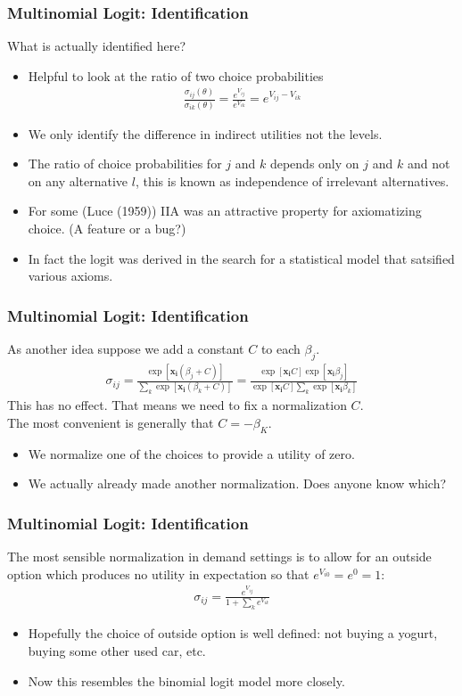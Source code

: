 \documentclass[aspectratio=169,11pt]{beamer}
\begin{document}
\begin{frame}
\frametitle{Multinomial Logit: Identification}
What is actually identified here?
\begin{itemize}
\item Helpful to look at the ratio of two choice probabilities
\begin{align*}
\frac{\sigma_{ij}(\theta)}{\sigma_{ik}(\theta)}  = \frac{e^{V_{ij}}}{e^{V_{ik}}} = e^{V_{ij} - V_{ik}}
\end{align*}
\item We only identify the \alert{difference in indirect utilities} not the levels.
\item The ratio of choice probabilities for $j$ and $k$ depends only on $j$ and $k$ and not on any alternative $l$, this is known as \alert{independence of irrelevant alternatives}.
\item For some (Luce (1959)) IIA was an attractive property for axiomatizing choice. (A feature or a bug?)
\item In fact the logit was derived in the search for a statistical model that satsified various axioms.
\end{itemize}
\end{frame}

\begin{frame}
\frametitle{Multinomial Logit: Identification}
As another idea suppose we add a constant $C$ to each $\beta_j$.
\begin{eqnarray*}
\sigma_{ij} = \frac{\exp[\symbf{x_i} (\beta_j+C) ]}{\sum_k \exp[\symbf{x_i} (\beta_k+C) ]} =  \frac{\exp[\symbf{x_i} C] \exp[\symbf{x_i} \beta_j ]}{\exp[\symbf{x_i} C] \sum_k \exp[\symbf{x_i} \beta_k ]}
\end{eqnarray*}
This has no effect.  That means we need to fix a normalization $C$.\\
 The most convenient is generally that $C = - \beta_K$.
\begin{itemize}
\item We normalize one of the choices to provide a utility of zero.
\item We actually already made another normalization. Does anyone know which?
\end{itemize}
\end{frame}


\begin{frame}
\frametitle{Multinomial Logit: Identification}
The most sensible normalization in demand settings is to allow for an \alert{outside option} which produces no utility in expectation so that $e^{V_{i0}} = e^{0}=1$:
\begin{eqnarray*}
\sigma_{ij} = \frac{e^{V_{ij} }}{1+\sum_k e^{V_{ik} }}
\end{eqnarray*}
\begin{itemize}
\item Hopefully the choice of outside option is well defined: not buying a yogurt, buying some other used car, etc.
\item Now this resembles the binomial logit model more closely.
\end{itemize}
\end{frame}
\end{document}

